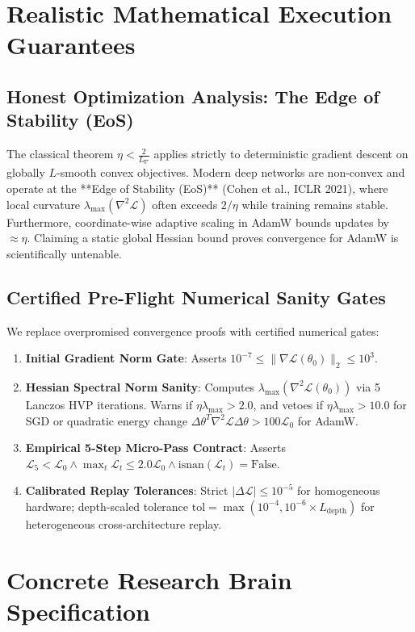\documentclass[11pt,a4paper]{article}
\begin{document}
\section{Realistic Mathematical Execution Guarantees}

\subsection{Honest Optimization Analysis: The Edge of Stability (EoS)}
The classical theorem $\eta < \frac{2}{L_\nabla}$ applies strictly to deterministic gradient descent on globally $L$-smooth convex objectives. Modern deep networks are non-convex and operate at the **Edge of Stability (EoS)** (Cohen et al., ICLR 2021), where local curvature $\lambda_{\max}(\nabla^2 \mathcal{L})$ often exceeds $2/\eta$ while training remains stable. Furthermore, coordinate-wise adaptive scaling in AdamW bounds updates by $\approx \eta$. Claiming a static global Hessian bound proves convergence for AdamW is scientifically untenable.

\subsection{Certified Pre-Flight Numerical Sanity Gates}
We replace overpromised convergence proofs with certified numerical gates:
\begin{enumerate}[noitemsep]
    \item \textbf{Initial Gradient Norm Gate}: Asserts $10^{-7} \le \|\nabla \mathcal{L}(\theta_0)\|_2 \le 10^3$.
    \item \textbf{Hessian Spectral Norm Sanity}: Computes $\lambda_{\max}(\nabla^2 \mathcal{L}(\theta_0))$ via 5 Lanczos HVP iterations. Warns if $\eta \lambda_{\max} > 2.0$, and vetoes if $\eta \lambda_{\max} > 10.0$ for SGD or quadratic energy change $\Delta \theta^T \nabla^2 \mathcal{L} \Delta \theta > 100 \mathcal{L}_0$ for AdamW.
    \item \textbf{Empirical 5-Step Micro-Pass Contract}: Asserts $\mathcal{L}_5 < \mathcal{L}_0 \land \max_{t} \mathcal{L}_t \le 2.0 \mathcal{L}_0 \land \text{isnan}(\mathcal{L}_t) = \text{False}$.
    \item \textbf{Calibrated Replay Tolerances}: Strict $|\Delta \mathcal{L}| \le 10^{-5}$ for homogeneous hardware; depth-scaled tolerance $\text{tol} = \max(10^{-4}, 10^{-6} \times L_{\text{depth}})$ for heterogeneous cross-architecture replay.
\end{enumerate}

\section{Concrete Research Brain Specification}
\end{document}
